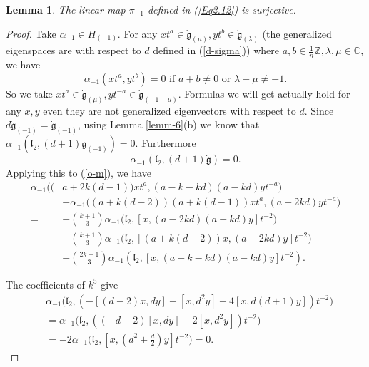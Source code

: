 \documentclass[1p]{elsarticle}
\numberwithin{equation}{section}
\def\dg{\dot{\mathfrak{g}}}
\def\bC{\mathbb{C}}
\def\bZ{\mathbb{Z}}
\def\fl{\mathfrak{l}}
\newtheorem{lemm}[theo]{Lemma}
\begin{document}


 \begin{lemm}\label{lemm-9} The linear map $\pi_{-1}$ defined in (\ref{Eq2.12}) is surjective. \end{lemm} %

 \begin{proof} Take $\alpha_{-1}\in H_{(-1)}$. For any $xt^a\in \dg_{(\mu)},yt^{b}\in \dg_{(\lambda)}
 	$ (the generalized eigenspaces are with respect to $d$ defined in  (\ref{d-sigma})) where $a, b\in\frac 1n\bZ, \lambda,\mu\in\bC$, we have
 	$$\alpha_{-1}(xt^a,yt^b)=0\text{ if }a+b\ne0\text{ or }\lambda+\mu\ne -1.$$
 	So we take  $xt^a\in \dg_{(\mu)},yt^{-a}\in \dg_{(-1-\mu)}$. Formulas we will get actually hold for any $x, y$ even they are not generalized eigenvectors with respect to $d$. Since
 	$d\dg_{(-1)}=\dg_{(-1)}$,
 	using Lemma \ref{lemm-6}(b) we know   that $\alpha_{-1}(\fl_2  ,(d+1)\dg_{(-1)})=0$. Furthermore
 	\begin{equation}\label{d+1}
 	\alpha_{-1}(\fl_2  ,(d+1)\dg)=0.\end{equation}
 	Applying this to  (\ref{o-m}), we have
 \begin{equation}\label{o-m--1}\begin{aligned}\alpha_{-1}\big((&a+2k(d-1))xt^a,(a-k-kd)(a-kd)yt^{-a}\big)\\ &-\alpha_{-1}\big((a+k(d-2))(a+k(d-1))xt^a,(a-2kd)yt^{-a}\big)\\ =&-\binom {k+1}3\alpha_{-1}\big(\fl_{2},[x,(a-2kd)(a-kd)y]t^{-2}\big)\\ & -\binom {k+1}3\alpha_{-1}\big(\fl_{2},[(a+k(d-2))x,(a-2kd)y]t^{-2}\big)\\
&+\binom {2k+1}3\alpha_{-1}(\fl_{2},[x,(a-k-kd)(a-kd)y]t^{-2}).\end{aligned}\end{equation}

The coefficients of $k^5$ give \begin{equation}\begin{aligned}&\alpha_{-1}\big(\fl_2, (-[(d-2)x,dy]+[x,d^2y]-4[x,d(d+1)y])t^{-2}\big)\\
&=\alpha_{-1}\big(\fl_2, ((-d-2)[x,dy]-2[x,d^2y])t^{-2}\big)\\ &=-2\alpha_{-1}\big(\fl_2,[x, (d^2+\frac d2)y]t^{-2}\big)=0.\end{aligned}\end{equation}


\end{proof}
\end{document}
